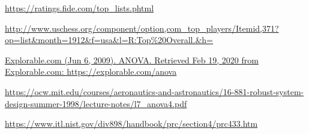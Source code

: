 \documentclass[12pt, titlepage]{article}
\begin{document}




\newpage
\begin{thebibliography}{thewidest}
\url{https://ratings.fide.com/top_lists.phtml}

  \url{http://www.uschess.org/component/option,com_top_players/Itemid,371?op=list&month=1912&f=usa&l=R:Top%20Overall.&h=}

\url{Explorable.com (Jun 6, 2009). ANOVA. Retrieved Feb 19, 2020 from Explorable.com: https://explorable.com/anova}

\url{https://ocw.mit.edu/courses/aeronautics-and-astronautics/16-881-robust-system-design-summer-1998/lecture-notes/l7_anova4.pdf}

\url{https://www.itl.nist.gov/div898/handbook/prc/section4/prc433.htm}
\end{thebibliography}
\end{document}
